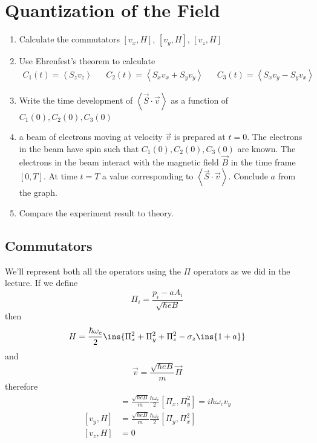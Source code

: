 \clearpage
\section{Quantization of the Field}
\begin{colbox}
	\begin{enumerate}
		\item Calculate the commutators \([v_x,H]\), \([v_y, H]\), \([v_z,H]\)
		\item Use Ehrenfest's theorem to calculate \begin{align}
			C_1(t) = \left\langle S_zv_z \right\rangle && C_2(t) = \left\langle S_xv_x+S_yv_y \right\rangle && C_3(t) = \left\langle S_xv_y - S_yv_x \right\rangle
		\end{align}
		\item Write the time development of \(\left\langle\vec{S}\cdot\vec{v}\right\rangle\) as a function of \(C_1(0), C_2(0), C_3(0)\)
		\item a beam of electrons moving at velocity \(\vec{v}\) is prepared at \(t=0\). The electrons in the beam have spin such that \(C_1(0), C_2(0), C_3(0)\) are known. The electrons in the beam interact with the magnetic field \(\vec{B}\) in the time frame \([0,T]\). At time \(t=T\) a value corresponding to \(\left\langle\vec{S}\cdot\vec{v}\right\rangle\). Conclude \(a\) from the graph.
		\item Compare the experiment result to theory.
	\end{enumerate}
\end{colbox}

\subsection{Commutators}
We'll represent both all the operators using the \(\Pi\) operators as we did in the lecture. If we define
\begin{equation}
	\Pi_i = \frac{p_i-aA_i}{\sqrt{\hbar eB}}
\end{equation}
then
\begin{align}
	H = \frac{\hbar \omega_c}{2}\ins{\Pi_x^2+\Pi_y^2+\Pi_z^2-\sigma_z\ins{1+a}}
\end{align}
and
\begin{equation}
	\vec{v} = \frac{\sqrt{\hbar eB}}{m}\vec{\Pi}
\end{equation}
therefore
\begin{align}
	[v_x,H] &= \frac{\sqrt{\hbar eB}}{m}\frac{\hbar\omega_c}{2}[\Pi_x,\Pi_y^2] = i\hbar\omega_c v_y \\
	[v_y,H] &= \frac{\sqrt{\hbar eB}}{m}\frac{\hbar\omega_c}{2}[\Pi_y,\Pi_x^2] \\
	[v_z,H] &= 0
\end{align}
